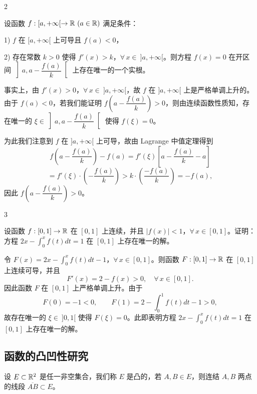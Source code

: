 \begin{sourceexample}{2}

	设函数 \(f:[a,+\infty[\to\R\ (a\in\R)\) 满足条件：

	1) \(f\) 在 \([a,+\infty[\) 上可导且 \(f(a)<0\)，

	2) 存在常数 \(k>0\) 使得 \(f'(x)>k\)，\(\forall\,x\in\ ]a,+\infty[\)。则方程 \(f(x)=0\) 在开区间 \(\left]a,a-\dfrac{f(a)}k\right[\) 上存在唯一的一个实根。

	事实上，由 \(f'(x)>0\)，\(\forall\,x\in\ ]a,+\infty[\)，故 \(f\) 在 \(]a,+\infty[\) 上是严格单调上升的。由于 \(f(a)<0\)，若我们能证明 \(f\left(a-\dfrac{f(a)}k\right)>0\)，则由连续函数性质知，存在唯一的 \(\xi\in\left]a,a-\dfrac{f(a)}k\right[\) 使得 \(f(\xi)=0\)。

	为此我们注意到 \(f\) 在 \(]a,+\infty[\) 上可导，故由 Lagrange 中值定理得到
	\[
	f\left(a-\frac{f(a)}k\right)-f(a)=f'(\xi)\left[a-\frac{f(a)}k-a\right]
	\]
	\[
	=f'(\xi)\cdot\left(-\frac{f(a)}k\right)>k\cdot\left(\frac{-f(a)}k\right)=-f(a),
	\]
	因此 \(f\left(a-\dfrac{f(a)}k\right)>0\)。

\end{sourceexample}

\begin{sourceexample}{3}

	设函数 \(f:[0,1]\to\mathbb{R}\) 在 \([0,1]\) 上连续，并且 \(|f(x)|<1\)，\(\forall\,x\in[0,1]\)。证明：方程 \(2x-\displaystyle\int_0^x f(t)dt=1\) 在 \([0,1]\) 上存在唯一的解。

	令 \(F(x)=2x-\displaystyle\int_0^x f(t)dt-1\)，\(\forall\,x\in[0,1]\)。则函数 \(F:[0,1]\to\mathbb{R}\) 在 \([0,1]\) 上连续可导，并且
	\[
	F'(x)=2-f(x)>0,\quad\forall\,x\in[0,1].
	\]
	因此函数 \(F\) 在 \([0,1]\) 上严格单调上升。由于
	\[
	F(0)=-1<0,\qquad F(1)=2-\int_0^1 f(t)dt-1>0,
	\]
	故存在唯一的 \(\xi\in\ ]0,1[\) 使得 \(F(\xi)=0\)。此即表明方程 \(2x-\displaystyle\int_0^x f(t)dt=1\) 在 \([0,1]\) 上存在唯一的解。

\end{sourceexample}

\subsection{函数的凸凹性研究}
	\label{sec:6-4-2}

\begin{mydef*}{}

	设 \(E\subset\mathbb{R}^2\) 是任一非空集合，我们称 \(E\) 是凸的，若 \(A,B\in E\)，则连结 \(A,B\) 两点的线段 \(\overline{AB}\subset E\)。

\end{mydef*}

